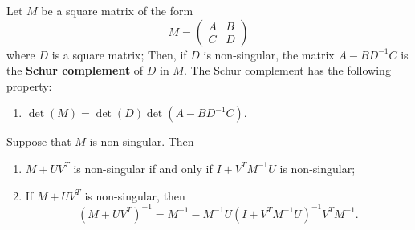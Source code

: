 \begin{definition}
    \label{def:schur}
    Let \(M\) be a square matrix of the form
    \[
        M =
        \begin{pmatrix}
            A & B \\
            C & D
        \end{pmatrix}
    \]
    where \(D\) is a square matrix; Then, if \(D\) is non-singular, the matrix \(A - B D^{-1} C\) is the \textbf{Schur complement} of \(D\) in \(M\).
    The Schur complement has the following property:
    \begin{enumerate}
      \item \(\det(M) = \det(D)\det(A - BD^{-1}C)\).
    \end{enumerate}
\end{definition}

\begin{theorem}
\label{thm:smw-formula}
  Suppose that \(M\) is non-singular. 
  Then
  \begin{enumerate}[label = (\arabic*)]
      \item \(M + UV^T\) is non-singular if and only if \(I + V^TM^{-1}U\) is non-singular;
      \item If \(M + UV^T\) is non-singular, then
      \[
          (M + UV^T)^{-1} = M^{-1} - M^{-1}U(I + V^TM^{-1}U)^{-1}V^TM^{-1}.
      \]
  \end{enumerate}
\end{theorem}

